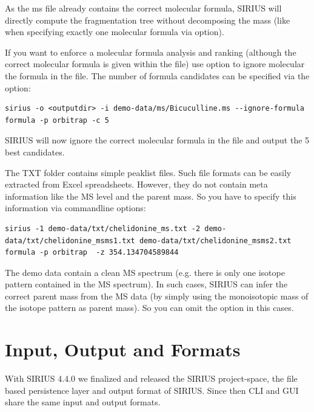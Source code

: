 \documentclass[letterpaper,10pt,openany,oneside]{sphinxmanual}
\begin{document}
As the ms file already contains the correct molecular formula, SIRIUS will
directly compute the fragmentation tree without decomposing the mass (like when specifying exactly one molecular formula via  option).

If you want to enforce a molecular formula analysis and ranking (although the correct molecular formula is given within the file)  use  option to ignore molecular the formula in the file. The number of formula candidates can be specified via the  option: 

\begin{Verbatim}[commandchars=\\\{\}]
sirius -o <outputdir> -i demo-data/ms/Bicuculline.ms --ignore-formula formula -p orbitrap -c 5
\end{Verbatim}

SIRIUS will now ignore the correct molecular formula in the file and output the 5 best candidates.

The TXT folder contains simple peaklist files. Such file formats can be easily extracted from Excel spreadsheets. However, they do not contain meta information like the MS level and the parent mass. So you have to specify this information via commandline options:

\begin{Verbatim}[commandchars=\\\{\}]
sirius -1 demo-data/txt/chelidonine_ms.txt -2 demo-data/txt/chelidonine_msms1.txt demo-data/txt/chelidonine_msms2.txt formula -p orbitrap  -z 354.134704589844
\end{Verbatim}

The demo data contain a clean MS spectrum (e.g. there is only one isotope pattern contained in the MS spectrum). In such cases, SIRIUS can infer the correct parent mass from the MS data (by simply using the monoisotopic mass of the isotope pattern as parent mass). So you can omit the  option in this cases.






\chapter{Input, Output and Formats}
With SIRIUS 4.4.0 we finalized and released the SIRIUS project-space, the file based persistence layer and output format of SIRIUS. Since then CLI and GUI share the same input and output formats. 
\end{document}

